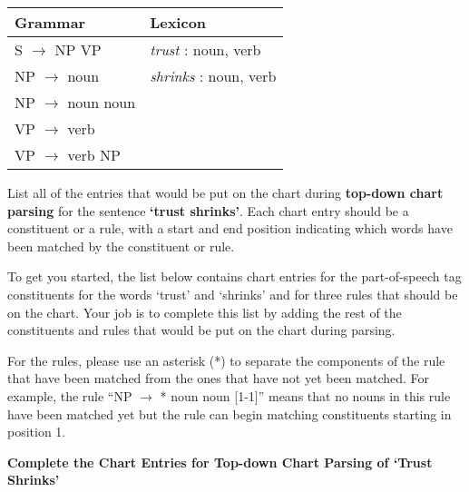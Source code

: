 \documentclass[11pt]{article}
\begin{document}
\begin{enumerate}
\begin{center}
\begin{tabular}{|ll|} \hline
\textbf{Grammar} & \textbf{Lexicon} \\  \hline
S $\rightarrow$ NP VP & {\it trust} : noun, verb \\
NP $\rightarrow$ noun & {\it shrinks} :  noun, verb \\
NP $\rightarrow$ noun noun  & ~ \\
VP $\rightarrow$ verb & ~ \\
VP $\rightarrow$ verb NP & ~ \\  \hline
\end{tabular}
\end{center}

\vspace*{.1in} List all of the entries that would be put on the chart during
{\bf top-down chart parsing} for the sentence {\bf `trust shrinks'}.
Each chart entry should be a constituent or a rule, with a start
and end position indicating which words have been matched by the
constituent or rule.

To get you started, the list below contains chart entries for the
part-of-speech tag constituents for the words `trust' and `shrinks'
and for three rules that should be on the chart. Your job is to complete
this list by adding the rest of the constituents and rules that would
be put on the chart during parsing.

For the rules, please use an asterisk (*) to separate the components
of the rule that have been matched from the ones that have not yet been
matched. For example, the rule ``NP $\rightarrow$ * noun noun [1-1]'' means that
no nouns in this rule have been matched yet but the rule
can begin matching constituents starting in position 1. \\ 

\begin{center}
{\bf Complete the Chart Entries for Top-down Chart Parsing of `Trust Shrinks'} 
\end{center}


\end{enumerate}
\end{document}
